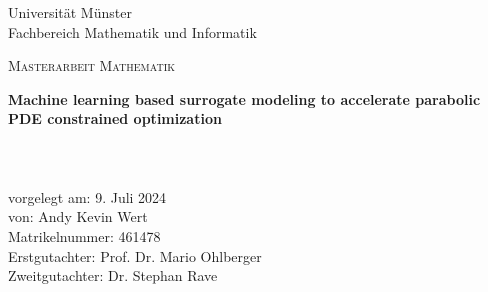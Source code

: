\thispagestyle{empty}
\begin{titlepage}
	 \thispagestyle{empty}
\begin{center}
 \thispagestyle{empty}

$~~$\\
{\Large Universität Münster}\\
\smallskip
{\Large Fachbereich Mathematik und Informatik}
\vfill
{\scshape\Large Masterarbeit Mathematik\par}
\vspace{1.5cm}
{\huge\bfseries Machine learning based surrogate modeling to accelerate parabolic PDE constrained optimization\par}
\paragraph{}$~~$\\
\paragraph{}$~~$\\
\paragraph{}$~~$\\
{\Large vorgelegt am: 9. Juli 2024}\\
\smallskip
{\Large von: Andy Kevin Wert}\\
\smallskip
{\Large Matrikelnummer: 461478}\\
\smallskip
{\Large Erstgutachter: Prof. Dr. Mario Ohlberger}\\
\smallskip
{\Large Zweitgutachter: Dr. Stephan Rave}\\
\vfill


\end{center}	
\end{titlepage}